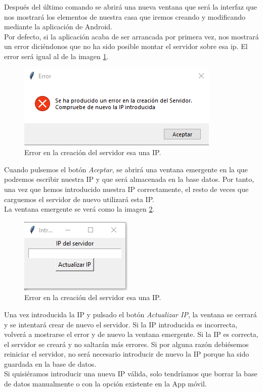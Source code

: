 Después del último comando se abrirá una nueva ventana que será la interfaz que nos mostrará los elementos de nuestra casa que iremos creando y modificando mediante la aplicación de Android. \\
Por defecto, si la aplicación acaba de ser arrancada por primera vez, nos mostrará un error diciéndonos que no ha sido posible montar el servidor sobre esa ip. El error será igual al de la imagen \ref{fig:error}.

\begin{figure}[h!]
	\centering
	\includegraphics[width=0.8\linewidth]{img/error}
	\caption{Error en la creación del servidor esa una IP.}
	\label{fig:error}
\end{figure}

Cuando pulsemos el botón \textit{Aceptar}, se abrirá una ventana emergente en la que podremos escribir nuestra IP y que será almacenada en la base datos. Por tanto, una vez que hemos introducido nuestra IP correctamente, el resto de veces que carguemos el servidor de nuevo utilizará esta IP. \\
La ventana emergente se verá como la imagen \ref{fig:ventanaEmergente}.

\begin{figure}[h!]
	\centering
	\includegraphics[width=0.4\linewidth]{img/ventanaEmergente}
	\caption{Error en la creación del servidor esa una IP.}
	\label{fig:ventanaEmergente}
\end{figure}

Una vez introducida la IP y pulsado el botón \textit{Actualizar IP}, la ventana se cerrará y se intentará crear de nuevo el servidor. Si la IP introducida es incorrecta, volverá a mostrarse el error y de nuevo la ventana emergente. Si la IP es correcta, el servidor se creará y no saltarán más errores. Si por alguna razón debiésemos reiniciar el servidor, no será necesario introducir de nuevo la IP porque ha sido guardada en la base de datos.\\
Si quisiéramos introducir una nueva IP válida, solo tendríamos que borrar la base de datos manualmente o con la opción existente en la App móvil. \\

